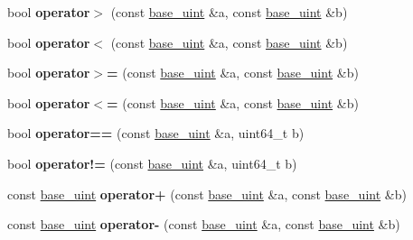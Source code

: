 \begin{DoxyCompactItemize}
bool {\bfseries operator$>$} (const \mbox{\hyperlink{classbase__uint}{base\+\_\+uint}} \&a, const \mbox{\hyperlink{classbase__uint}{base\+\_\+uint}} \&b)
\item 
\mbox{\label{classbase__uint_a89272b5112f90ba683c0f066ba1426c1}} 
bool {\bfseries operator$<$} (const \mbox{\hyperlink{classbase__uint}{base\+\_\+uint}} \&a, const \mbox{\hyperlink{classbase__uint}{base\+\_\+uint}} \&b)
\item 
\mbox{\label{classbase__uint_a9eb243df5a6dfa3d0cd326427d99bfa6}} 
bool {\bfseries operator$>$=} (const \mbox{\hyperlink{classbase__uint}{base\+\_\+uint}} \&a, const \mbox{\hyperlink{classbase__uint}{base\+\_\+uint}} \&b)
\item 
\mbox{\label{classbase__uint_ac7f1bdba7208bd852f7b00f7c49624f8}} 
bool {\bfseries operator$<$=} (const \mbox{\hyperlink{classbase__uint}{base\+\_\+uint}} \&a, const \mbox{\hyperlink{classbase__uint}{base\+\_\+uint}} \&b)
\item 
\mbox{\label{classbase__uint_a977dbbe7e78bbdcc2aea2dc16292d424}} 
bool {\bfseries operator==} (const \mbox{\hyperlink{classbase__uint}{base\+\_\+uint}} \&a, uint64\+\_\+t b)
\item 
\mbox{\label{classbase__uint_ab7b366cc0883f25fa57fb09d4bc33807}} 
bool {\bfseries operator!=} (const \mbox{\hyperlink{classbase__uint}{base\+\_\+uint}} \&a, uint64\+\_\+t b)
\item 
\mbox{\label{classbase__uint_ab46abc7a4c02bbbe6ee4d44db58f36fd}} 
const \mbox{\hyperlink{classbase__uint}{base\+\_\+uint}} {\bfseries operator+} (const \mbox{\hyperlink{classbase__uint}{base\+\_\+uint}} \&a, const \mbox{\hyperlink{classbase__uint}{base\+\_\+uint}} \&b)
\item 
\mbox{\label{classbase__uint_a42603f675219a79c1087da39677dd6d3}} 
const \mbox{\hyperlink{classbase__uint}{base\+\_\+uint}} {\bfseries operator-\/} (const \mbox{\hyperlink{classbase__uint}{base\+\_\+uint}} \&a, const \mbox{\hyperlink{classbase__uint}{base\+\_\+uint}} \&b)
\item 
\mbox{\label{classbase__uint_a25d8b19e2def66185a4a38f17d01ccd7}} 

\end{DoxyCompactItemize}
